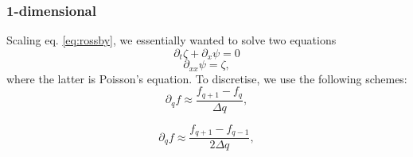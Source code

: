 \subsubsection{1-dimensional}
Scaling eq. \ref{eq:rossby}, we essentially wanted to solve two equations
	\begin{equation}
	\label{eq:betaplane}
		\partial_t \zeta + \partial_x \psi = 0
	\end{equation}
	\begin{equation}
		\label{eq:poisson}
		\partial_{xx}\psi = \zeta,
	\end{equation}
where the latter is Poisson's equation. To discretise, we use the following schemes:
	\begin{equation}
	\label{eq:explicit}
	\partial_q f \approx \frac{f_{q+1} - f_q}{\Delta q},
	\end{equation}

	\begin{equation}
	\label{eq:implicit}
		\partial_q f \approx \frac{f_{q+1} - f_{q-1}}{2\Delta q},
	\end{equation}
	
